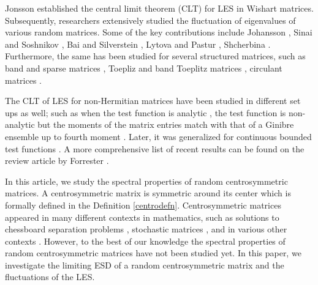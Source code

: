 \documentclass[12pt]{amsart}
\theoremstyle{plain}
\theoremstyle{definition}
\begin{document}
Jonsson \cite{Jonsson1982SomeLT} established the central limit theorem (CLT) for LES in Wishart matrices. Subsequently, researchers extensively studied the fluctuation of eigenvalues of various random matrices. Some of the key contributions include Johansson \cite{johansson1998fluctuations}, Sinai and Soshnikov \cite{sinai1998central}, Bai and Silverstein \cite{bai2008clt}, Lytova and Pastur \cite{lytova2009central},  Shcherbina \cite{shcherbina2011central}. Furthermore, the same has been studied for several structured matrices, such as band and sparse matrices \cite{anderson2006clt, li2013central, shcherbina2015fluctuations, jana2016fluctuations}, Toepliz and band Toeplitz matrices \cite{chatterjee2009fluctuations, liu2012fluctuations}, circulant matrices \cite{adhikari2017fluctuations, adhikari2018universality, maurya2021fluctuations}.


The CLT of LES for non-Hermitian matrices have been studied in different set ups as well; such as when the test function is analytic \cite{rider2006gaussian, o2016central, jana2022clt}, the test function is non-analytic but the moments of the matrix entries match with that of a Ginibre ensemble up to fourth moment \cite{kopel2015linear}. Later, it was generalized for continuous bounded test functions \cite{cipolloni2021fluctuation, cipolloni2022fluctuations, cipolloni2023central}. A more comprehensive list of recent results can be found on the review article by Forrester \cite{forrester2023review}.

In this article, we study the spectral properties of random centrosymmetric matrices. A centrosymmetric matrix is symmetric around its center which is formally defined in the Definition \ref{centrodefn}. Centrosymmetric matrices appeared in many different contexts in mathematics, such as solutions to chessboard separation problems \cite{chatham2012centrosymmetric}, stochastic matrices \cite{cao2022centrosymmetric}, and in various other contexts \cite{cruse1977some, tao2002spectral, rojo2004some, bai2005inverse}. However, to the best of our knowledge the spectral properties of random centrosymmetric matrices have not been studied yet. In this paper, we investigate the limiting ESD of a random centrosymmetric matrix and the fluctuations of the LES.



\end{document}

